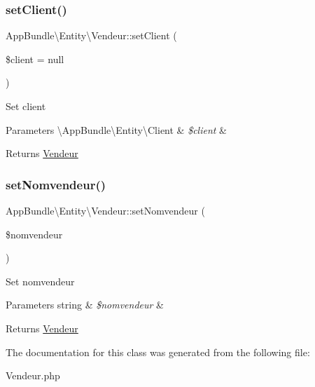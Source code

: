 \subsubsection{\texorpdfstring{set\+Client()}{setClient()}}
{\footnotesize\ttfamily App\+Bundle\textbackslash{}\+Entity\textbackslash{}\+Vendeur\+::set\+Client (\begin{DoxyParamCaption}\item[{\textbackslash{}\hyperlink{class_app_bundle_1_1_entity_1_1_client}{App\+Bundle\textbackslash{}\+Entity\textbackslash{}\+Client}}]{\$client = {\ttfamily null} }\end{DoxyParamCaption})}

Set client


\begin{DoxyParams}[1]{Parameters}
\textbackslash{}\+App\+Bundle\textbackslash{}\+Entity\textbackslash{}\+Client & {\em \$client} & \\
\hline
\end{DoxyParams}
\begin{DoxyReturn}{Returns}
\hyperlink{class_app_bundle_1_1_entity_1_1_vendeur}{Vendeur} 
\end{DoxyReturn}
\mbox{\label{class_app_bundle_1_1_entity_1_1_vendeur_a8d691e2b5b4ca91b539807b63db0eb51}} 
\subsubsection{\texorpdfstring{set\+Nomvendeur()}{setNomvendeur()}}
{\footnotesize\ttfamily App\+Bundle\textbackslash{}\+Entity\textbackslash{}\+Vendeur\+::set\+Nomvendeur (\begin{DoxyParamCaption}\item[{}]{\$nomvendeur }\end{DoxyParamCaption})}

Set nomvendeur


\begin{DoxyParams}[1]{Parameters}
string & {\em \$nomvendeur} & \\
\hline
\end{DoxyParams}
\begin{DoxyReturn}{Returns}
\hyperlink{class_app_bundle_1_1_entity_1_1_vendeur}{Vendeur} 
\end{DoxyReturn}


The documentation for this class was generated from the following file\+:\begin{DoxyCompactItemize}
\item 
Vendeur.\+php\end{DoxyCompactItemize}
